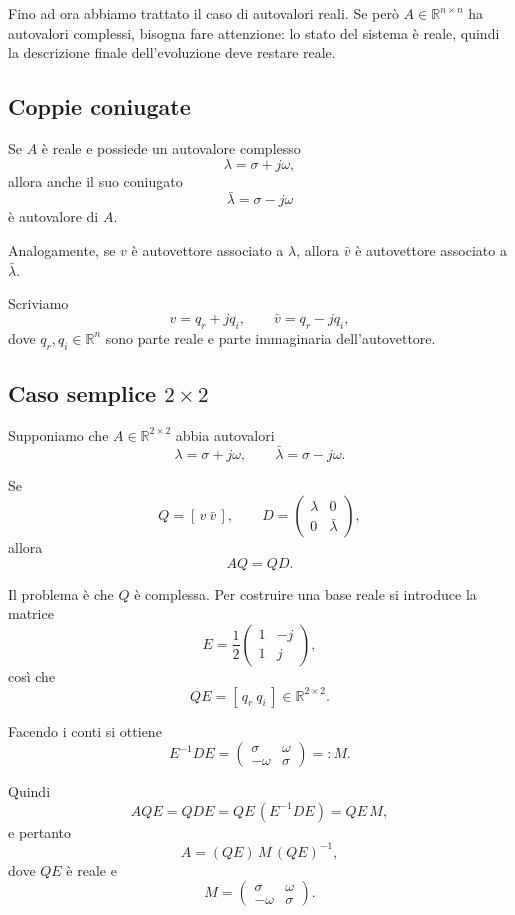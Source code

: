 Fino ad ora abbiamo trattato il caso di autovalori reali.  
Se però $A\in\mathbb{R}^{n\times n}$ ha autovalori complessi, bisogna fare attenzione: lo stato del sistema è reale, quindi la descrizione finale dell'evoluzione deve restare reale.

\subsection{Coppie coniugate}

Se $A$ è reale e possiede un autovalore complesso
\[
\lambda=\sigma+j\omega,
\]
allora anche il suo coniugato
\[
\bar\lambda=\sigma-j\omega
\]
è autovalore di $A$.

Analogamente, se $v$ è autovettore associato a $\lambda$, allora $\bar v$ è autovettore associato a $\bar\lambda$.

Scriviamo
\[
v=q_r+jq_i,
\qquad
\bar v=q_r-jq_i,
\]
dove $q_r,q_i\in\mathbb{R}^n$ sono parte reale e parte immaginaria dell'autovettore.

\subsection{Caso semplice \texorpdfstring{$2\times 2$}{2x2}}

Supponiamo che $A\in\mathbb{R}^{2\times 2}$ abbia autovalori
\[
\lambda=\sigma+j\omega,
\qquad
\bar\lambda=\sigma-j\omega.
\]

Se
\[
Q=[\,v\ \bar v\,],
\qquad
D=
\begin{pmatrix}
\lambda & 0\\
0 & \bar\lambda
\end{pmatrix},
\]
allora
\[
AQ=QD.
\]

Il problema è che $Q$ è complessa. Per costruire una base reale si introduce la matrice
\[
E=\frac12
\begin{pmatrix}
1 & -j\\
1 & j
\end{pmatrix},
\]
così che
\[
QE=[\,q_r\ q_i\,]\in\mathbb{R}^{2\times 2}.
\]

Facendo i conti si ottiene
\[
E^{-1}DE
=
\begin{pmatrix}
\sigma & \omega\\
-\omega & \sigma
\end{pmatrix}
=:M.
\]

Quindi
\[
AQE=QDE=QE\,(E^{-1}DE)=QE\,M,
\]
e pertanto
\begin{equation}
A=(QE)\,M\,(QE)^{-1},
\label{eq:L6_real_reduction_complex}
\end{equation}
dove $QE$ è reale e
\begin{equation}
M=
\begin{pmatrix}
\sigma & \omega\\
-\omega & \sigma
\end{pmatrix}.
\label{eq:L6_real_block_complex_pair}
\end{equation}

